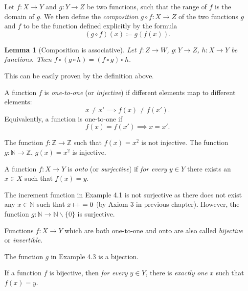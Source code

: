 \documentclass[12pt]{article}
\newtheorem{lemma}[theorem]{Lemma}
\theoremstyle{remark}
\begin{document}
\begin{definition}[Composition]
    Let $ f : X \rightarrow Y $ and $ g : Y \rightarrow Z $ be two functions, such that the range of $ f $ is the domain of $ g $. We then define the \textit{composition} $ g \circ f : X \rightarrow Z $ of the two functions $ g $ and $ f $ to be the function defined explicitly by the formula 
    \begin{equation*}
	    (g \circ f)(x) \coloneqq g(f(x)).
    \end{equation*}
\end{definition}

\begin{lemma}[Composition is associative]
	Let $ f : Z \rightarrow W $, $ g : Y \rightarrow Z $, $ h : X \rightarrow Y $  be functions. Then $ f \circ (g \circ h) = (f \circ g) \circ h $.   
\end{lemma}
This can be easily proven by the definition above.

\begin{definition}
    A function $ f $ is \textit{one-to-one} (or \textit{injective}) if different elements map to different elements: 
    \[ x \neq x' \implies f(x) \neq f(x'). \]
    Equivalently, a function is one-to-one if 
    \[ f(x) = f(x') \implies x = x'. \]
\end{definition}

\begin{example}[Informal]
	The function $ f : \mathbb{Z} \rightarrow \mathbb{Z} $ such that $ f(x) = x^2 $ is not injective. The function $ g : \mathbb{N} \rightarrow \mathbb{Z} $, $ g(x) = x^2 $ is injective. 
\end{example}

\begin{definition}
    A function $ f : X \rightarrow Y $ is \textit{onto} (or \textit{surjective}) if \textit{for every} $ y  \in Y $ there exists an $ x \in X $ such that $ f(x) = y $.
\end{definition}

\begin{example}
	The increment function in Example 4.1 is not surjective as there does not exist any $ x \in \mathbb{N} $ such that $ x\inc = 0 $ (by Axiom 3 in previous chapter). However, the function $ g : \mathbb{N} \rightarrow \mathbb{N} \backslash \{ 0 \} $ is surjective. 
\end{example}

\begin{definition}
    Functions $ f : X \rightarrow Y $ which are both one-to-one and onto are also called \textit{bijective} or \textit{invertible}.
\end{definition}

\begin{example}
    The function $ g $ in Example 4.3 is a bijection. 
\end{example}

If a function $ f $ is bijective, then \textit{for every} $ y \in Y $, there is \textit{exactly one} $ x $ such that $ f(x) = y $.
\end{document}

